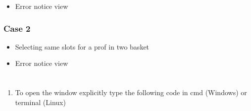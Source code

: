 \documentclass[letterpaper,10pt,english]{sphinxmanual}
\begin{document}
\begin{itemize}
\item {} 
Error notice view

\end{itemize}



\subsubsection{Case 2}
\label{\detokenize{user_manual:id5}}\begin{itemize}
\item {} 
Selecting same slots for a prof in two basket

\end{itemize}

\begin{itemize}
\item {} 
Error notice view

\end{itemize}



\section{}
\label{\detokenize{user_manual:working-in-gui-3}}

\subsection{}
\label{\detokenize{user_manual:id6}}
\begin{enumerate}
%
\item {} 
To open the window explicitly type the following code in cmd (Windows) or terminal (Linux)

\end{enumerate}
\end{document}
